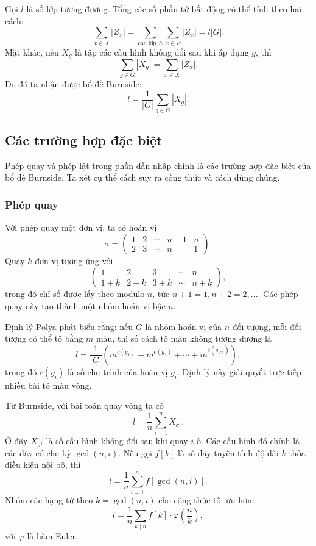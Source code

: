 \documentclass[11pt]{article}
\begin{document}
Gọi \(l\) là số lớp tương đương. Tổng các số phần tử bất động có thể tính theo
hai cách:
\[
  \sum_{x\in X}|Z_x|
  = \sum_{\text{các lớp } E}\sum_{x\in E}|Z_x|
  = l|G|.
\]
Mặt khác, nếu \(X_g\) là tập các cấu hình không đổi sau khi áp dụng \(g\), thì
\[
  \sum_{g\in G}|X_g|=\sum_{x\in X}|Z_x|.
\]
Do đó ta nhận được bổ đề Burnside:
\[
  l=\frac{1}{|G|}\sum_{g\in G}|X_g|.
  \tag{11}
\]

\subsection{Các trường hợp đặc biệt}

Phép quay và phép lật trong phần dẫn nhập chính là các trường hợp đặc biệt của
bổ đề Burnside. Ta xét cụ thể cách suy ra công thức và cách dùng chúng.

\subsubsection{Phép quay}

Với phép quay một đơn vị, ta có hoán vị
\[
  \sigma =
  \begin{pmatrix}
    1 & 2 & \cdots & n-1 & n\\
    2 & 3 & \cdots & n & 1
  \end{pmatrix}.
\]
Quay \(k\) đơn vị tương ứng với
\[
  \begin{pmatrix}
    1 & 2 & 3 & \cdots & n\\
    1+k & 2+k & 3+k & \cdots & n+k
  \end{pmatrix},
  \tag{12}
\]
trong đó chỉ số được lấy theo modulo \(n\), tức \(n+1=1,n+2=2,\ldots\).
Các phép quay này tạo thành một nhóm hoán vị bậc \(n\).

Định lý Polya phát biểu rằng: nếu \(G\) là nhóm hoán vị của \(n\) đối tượng,
mỗi đối tượng có thể tô bằng \(m\) màu, thì số cách tô màu không tương đương là
\[
  l=\frac{1}{|G|}\left(m^{c(g_1)}+m^{c(g_2)}+\cdots+m^{c(g_{|G|})}\right),
  \tag{13}
\]
trong đó \(c(g_i)\) là số chu trình của hoán vị \(g_i\). Định lý này giải
quyết trực tiếp nhiều bài tô màu vòng.

Từ Burnside, với bài toán quay vòng ta có
\[
  l=\frac{1}{n}\sum_{i=1}^{n} X_{\sigma^i}.
\]
Ở đây \(X_{\sigma^i}\) là số cấu hình không đổi sau khi quay \(i\) ô. Các cấu
hình đó chính là các dãy có chu kỳ \(\gcd(n,i)\). Nếu gọi \(f[k]\) là số dãy
tuyến tính độ dài \(k\) thỏa điều kiện nội bộ, thì
\[
  l=\frac{1}{n}\sum_{i=1}^{n} f[\gcd(n,i)].
\]
Nhóm các hạng tử theo \(k=\gcd(n,i)\) cho công thức tối ưu hơn:
\[
  l=\frac{1}{n}\sum_{k\mid n} f[k]\cdot \varphi\left(\frac{n}{k}\right),
  \tag{14}
\]
với \(\varphi\) là hàm Euler.
\end{document}
